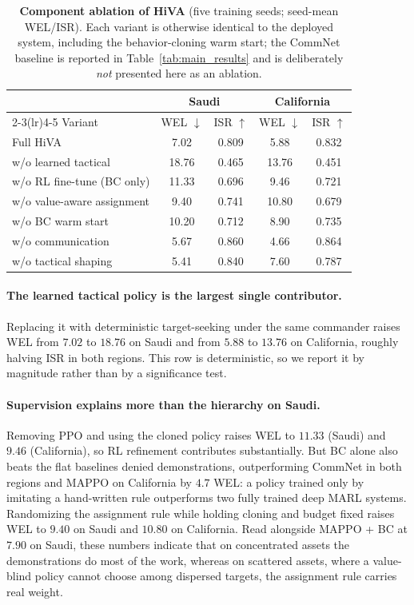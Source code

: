\documentclass[letterpaper]{article}
\begin{document}
\begin{table}[t]
\centering
\caption{\textbf{Component ablation of HiVA} (five training seeds; seed-mean WEL/ISR). Each variant is otherwise identical to the deployed system, including the behavior-cloning warm start; the CommNet baseline is reported in Table~\ref{tab:main_results} and is deliberately \emph{not} presented here as an ablation.}
\label{tab:ablation}
\vspace{0.5em}
\setlength{\tabcolsep}{3.5pt}\small
\begin{tabular}{lcccc}
	\toprule
	& \multicolumn{2}{c}{Saudi} & \multicolumn{2}{c}{California} \\
	\cmidrule(lr){2-3}\cmidrule(lr){4-5}
	Variant & WEL $\downarrow$ & ISR $\uparrow$ & WEL $\downarrow$ & ISR $\uparrow$ \\
	\midrule
	Full HiVA & 7.02 & 0.809 & 5.88 & 0.832 \\
	w/o learned tactical & 18.76 & 0.465 & 13.76 & 0.451 \\
	w/o RL fine-tune (BC only) & 11.33 & 0.696 & 9.46 & 0.721 \\
	w/o value-aware assignment & 9.40 & 0.741 & 10.80 & 0.679 \\
	w/o BC warm start & 10.20 & 0.712 & 8.90 & 0.735 \\
	w/o communication & 5.67 & 0.860 & 4.66 & 0.864 \\
	w/o tactical shaping & 5.41 & 0.840 & 7.60 & 0.787 \\
	\bottomrule
\end{tabular}
\end{table}

\paragraph{The learned tactical policy is the largest single contributor.} Replacing it with deterministic target-seeking under the same commander raises WEL from $7.02$ to $18.76$ on Saudi and from $5.88$ to $13.76$ on California, roughly halving ISR in both regions. This row is deterministic, so we report it by magnitude rather than by a significance test.

\paragraph{Supervision explains more than the hierarchy on Saudi.} Removing PPO and using the cloned policy raises WEL to $11.33$ (Saudi) and $9.46$ (California), so RL refinement contributes substantially. But BC alone also beats the flat baselines denied demonstrations, outperforming CommNet in both regions and MAPPO on California by $4.7$ WEL: a policy trained only by imitating a hand-written rule outperforms two fully trained deep MARL systems. Randomizing the assignment rule while holding cloning and budget fixed raises WEL to $9.40$ on Saudi and $10.80$ on California. Read alongside MAPPO + BC at $7.90$ on Saudi, these numbers indicate that on concentrated assets the demonstrations do most of the work, whereas on scattered assets, where a value-blind policy cannot choose among dispersed targets, the assignment rule carries real weight.
\end{document}
